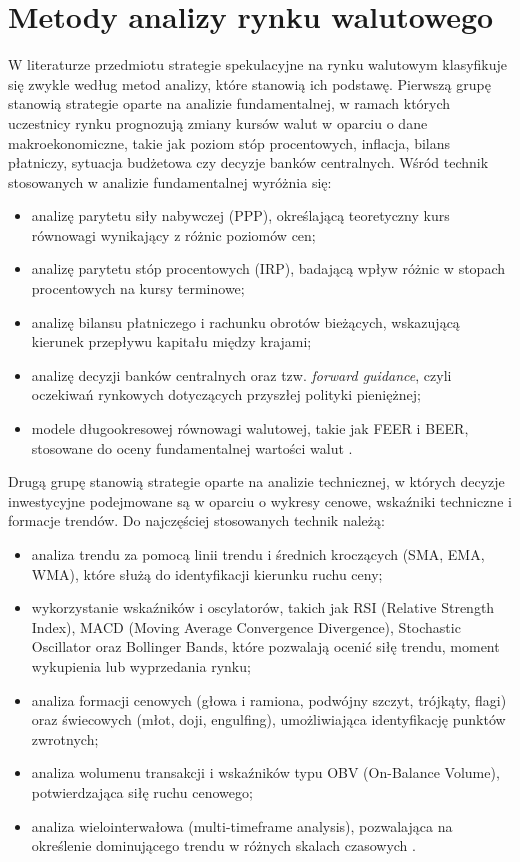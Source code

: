 \section{Metody analizy rynku walutowego}

W literaturze przedmiotu strategie spekulacyjne na rynku walutowym klasyfikuje się zwykle według metod analizy, które stanowią ich podstawę. Pierwszą grupę stanowią strategie oparte na analizie fundamentalnej, w ramach których uczestnicy rynku prognozują zmiany kursów walut w oparciu o dane makroekonomiczne, takie jak poziom stóp procentowych, inflacja, bilans płatniczy, sytuacja budżetowa czy decyzje banków centralnych. Wśród technik stosowanych w analizie fundamentalnej wyróżnia się:
\begin{itemize}
    \item analizę parytetu siły nabywczej (PPP), określającą teoretyczny kurs równowagi wynikający z różnic poziomów cen;
    \item analizę parytetu stóp procentowych (IRP), badającą wpływ różnic w stopach procentowych na kursy terminowe;
    \item analizę bilansu płatniczego i rachunku obrotów bieżących, wskazującą kierunek przepływu kapitału między krajami;
    \item analizę decyzji banków centralnych oraz tzw. \emph{forward guidance}, czyli oczekiwań rynkowych dotyczących przyszłej polityki pieniężnej;
    \item modele długookresowej równowagi walutowej, takie jak FEER i BEER, stosowane do oceny fundamentalnej wartości walut \parencite{mishkin2019}.
\end{itemize}

Drugą grupę stanowią strategie oparte na analizie technicznej, w których decyzje inwestycyjne podejmowane są w oparciu o wykresy cenowe, wskaźniki techniczne i formacje trendów. Do najczęściej stosowanych technik należą:
\begin{itemize}
    \item analiza trendu za pomocą linii trendu i średnich kroczących (SMA, EMA, WMA), które służą do identyfikacji kierunku ruchu ceny;
    \item wykorzystanie wskaźników i oscylatorów, takich jak RSI (Relative Strength Index), MACD (Moving Average Convergence Divergence), Stochastic Oscillator oraz Bollinger Bands, które pozwalają ocenić siłę trendu, moment wykupienia lub wyprzedania rynku;
    \item analiza formacji cenowych (głowa i ramiona, podwójny szczyt, trójkąty, flagi) oraz świecowych (młot, doji, engulfing), umożliwiająca identyfikację punktów zwrotnych;
    \item analiza wolumenu transakcji i wskaźników typu OBV (On-Balance Volume), potwierdzająca siłę ruchu cenowego;
    \item analiza wielointerwałowa (multi-timeframe analysis), pozwalająca na określenie dominującego trendu w różnych skalach czasowych \parencite{elder2014}.
\end{itemize}

